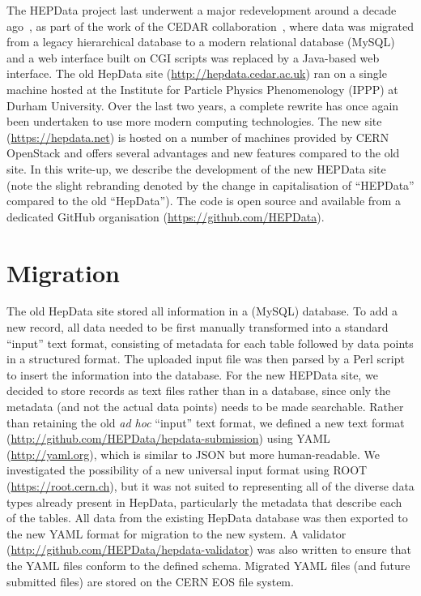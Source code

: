 \documentclass[a4paper]{jpconf}
\begin{document}
The HEPData project last underwent a major redevelopment around a decade ago~\cite{Buckley:2010jn}, as part of the work of the CEDAR collaboration~\cite{Buckley:2007hi}, where data was migrated from a legacy hierarchical database to a modern relational database (MySQL) and a web interface built on CGI scripts was replaced by a Java-based web interface.  The old HepData site (\url{http://hepdata.cedar.ac.uk}) ran on a single machine hosted at the Institute for Particle Physics Phenomenology (IPPP) at Durham University.  Over the last two years, a complete rewrite has once again been undertaken to use more modern computing technologies.  The new site (\url{https://hepdata.net}) is hosted on a number of machines provided by CERN OpenStack and offers several advantages and new features compared to the old site.  In this write-up, we describe the development of the new HEPData site (note the slight rebranding denoted by the change in capitalisation of ``HEPData'' compared to the old ``HepData'').  The code is open source and available from a dedicated GitHub organisation (\url{https://github.com/HEPData}).

\section{Migration}

The old HepData site stored all information in a (MySQL) database.  To add a new record, all data needed to be first manually transformed into a standard ``input'' text format, consisting of metadata for each table followed by data points in a structured format.  The uploaded input file was then parsed by a Perl script to insert the information into the database.  For the new HEPData site, we decided to store records as text files rather than in a database, since only the metadata (and not the actual data points) needs to be made searchable.  Rather than retaining the old \emph{ad hoc} ``input'' text format, we defined a new text format (\url{http://github.com/HEPData/hepdata-submission}) using YAML (\url{http://yaml.org}), which is similar to JSON but more human-readable.  We investigated the possibility of a new universal input format using ROOT (\url{https://root.cern.ch}), but it was not suited to representing all of the diverse data types already present in HepData, particularly the metadata that describe each of the tables.  All data from the existing HepData database was then exported to the new YAML format for migration to the new system.  A validator (\url{http://github.com/HEPData/hepdata-validator}) was also written to ensure that the YAML files conform to the defined schema.  Migrated YAML files (and future submitted files) are stored on the CERN EOS file system.
\end{document}
